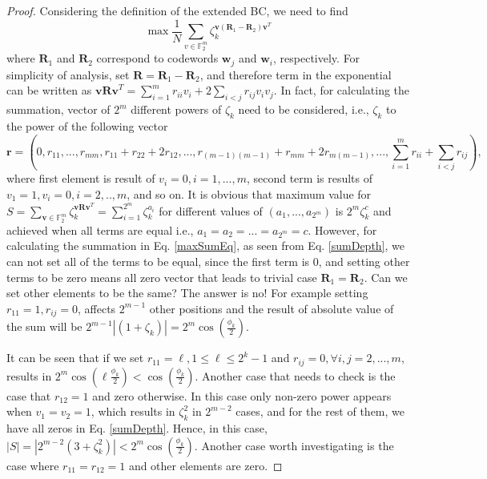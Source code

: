 \documentclass[lettersize,journal,onecolumn]{IEEEtran}
\begin{document}
\begin{proof}
	Considering the definition of the extended BC, we need to find 
	\begin{equation}\label{maxSumEq}
		\max \frac{1}{N}\sum_{v\in \mathbb{F}_2^m }{\zeta_k^{\mathbf{v} \left(\mathbf{R}_1- \mathbf{R}_2 \right) \mathbf{v}^T }}
	\end{equation}
where $\mathbf{R}_1$ and $\mathbf{R}_2$ correspond to codewords $\mathbf{w}_j$ and $\mathbf{w}_i$, respectively. For simplicity of analysis, set $\mathbf{R}=\mathbf{R}_1-\mathbf{R}_2$, and therefore term in the exponential can be written as $\mathbf{v R v}^T = \sum_{i=1}^m{r_{ii} v_i}+2\sum_{i<j}{r_{ij} v_i v_j } $. In fact, for calculating the summation, vector of $2^m$ different powers of $\zeta_k$ need to be considered, i.e., $\zeta_k$ to the power of the following vector
\begin{equation}\label{sumDepth}
	\mathbf{r} = \left( 0, r_{11}, ...,r_{mm}, r_{11}+r_{22}+2r_{12},...,r_{(m-1)(m-1)}+r_{mm}+2r_{m(m-1)},...,\sum_{i=1}^{m}{r_{ii}} +\sum_{i<j}{r_{ij}}\right),
\end{equation}
where first element is result of $v_i = 0, i=1,...,m$, second term is results of $v_1=1, v_i=0, i=2,..,m$, and so on. It is obvious that maximum value for $S = \sum_{\mathbf{v} \in \mathbb{F}_2^m}{\zeta_k^{\mathbf{v R v}^T}} = \sum_{i=1}^{2^m}{\zeta_k^{a_i}}$ for different values of $\left(a_1,...,a_{2^m}\right)$ is $2^m \zeta_k^c$ and achieved when all terms are equal i.e., $a_1=a_2=...=a_{2^m}=c$. However, for calculating the summation in Eq. \eqref{maxSumEq}, as seen from Eq. \eqref{sumDepth}, we can not set all of the terms to be equal, since the first term is $0$, and setting other terms to be zero means all zero vector that leads to trivial case $\mathbf{R}_1 = \mathbf{R}_2$. Can we set other elements to be the same? The answer is no! For example setting $r_{11}=1, r_{ij} = 0$, affects $2^{m-1}$ other positions and the result of absolute value of the sum will be $2^{m-1}\left\lvert \left(1+\zeta_k\right) \right\rvert=2^{m}\cos\left(\frac{\phi_k}{2}\right)$. 

It can be seen that if we set $r_{11}=\ell, 1\le \ell \le 2^k-1$ and $r_{ij}=0, \forall i,j = 2,...,m$, results in $2^m \cos\left(\ell \frac{\phi_k}{2}\right)< \cos\left( \frac{\phi_k}{2}\right)$. Another case that needs to check is the case that $r_{12}=1$ and zero otherwise. In this case only non-zero power appears when $v_1 = v_2 = 1$, which results in $\zeta_k^{2}$ in $2^{m-2}$ cases, and for the rest of them, we have all zeros in Eq. \eqref{sumDepth}. Hence, in this case, $\left\lvert S \right\rvert = \left\lvert 2^{m-2}\left(3+\zeta_k^2\right) \right\rvert < 2^m \cos\left(\frac{\phi_k}{2}\right)$. Another case worth investigating is the case where $r_{11}=r_{12} = 1$ and other elements are zero. 


\end{proof}
\end{document}
